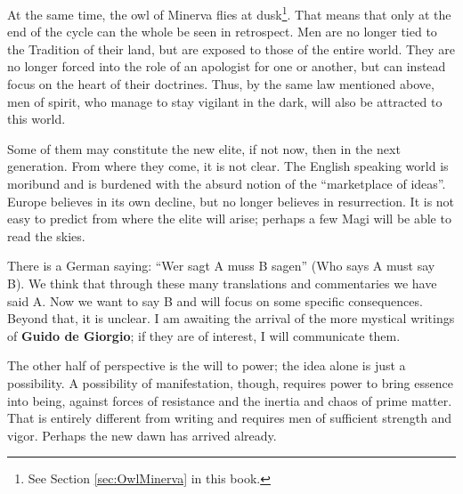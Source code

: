 At the same time, the owl of Minerva flies at dusk\footnote{See Section \ref{sec:OwlMinerva} in this book.}. That means that only at the end of the cycle can the whole be seen in retrospect. Men are no longer tied to the Tradition of their land, but are exposed to those of the entire world. They are no longer forced into the role of an apologist for one or another, but can instead focus on the heart of their doctrines. Thus, by the same law mentioned above, men of spirit, who manage to stay vigilant in the dark, will also be attracted to this world.

Some of them may constitute the new elite, if not now, then in the next generation. From where they come, it is not clear. The English speaking world is moribund and is burdened with the absurd notion of the ``marketplace of ideas''. Europe believes in its own decline, but no longer believes in resurrection. It is not easy to predict from where the elite will arise; perhaps a few Magi will be able to read the skies.

There is a German saying: ``Wer sagt A muss B sagen'' (Who says A must say B). We think that through these many translations and commentaries we have said A. Now we want to say B and will focus on some specific consequences. Beyond that, it is unclear. I am awaiting the arrival of the more mystical writings of \textbf{Guido de Giorgio}; if they are of interest, I will communicate them.

The other half of perspective is the will to power; the idea alone is just a possibility. A possibility of manifestation, though, requires power to bring essence into being, against forces of resistance and the inertia and chaos of prime matter. That is entirely different from writing and requires men of sufficient strength and vigor. Perhaps the new dawn has arrived already.



